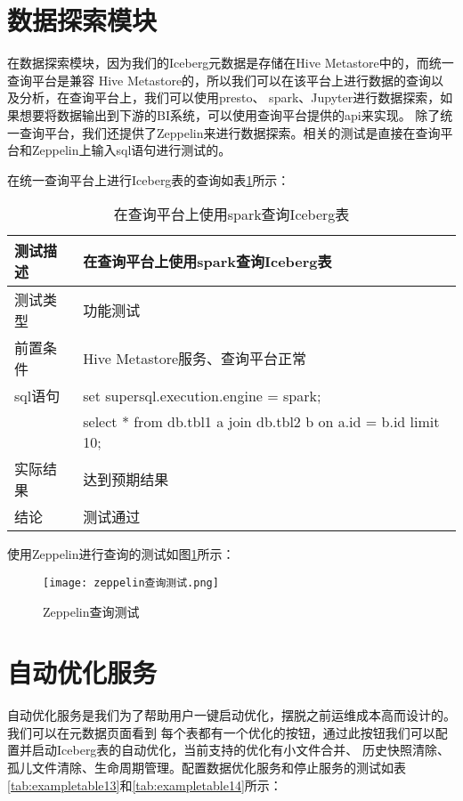 \section{数据探索模块}

在数据探索模块，因为我们的Iceberg元数据是存储在Hive Metastore中的，而统一查询平台是兼容
Hive Metastore的，所以我们可以在该平台上进行数据的查询以及分析，在查询平台上，我们可以使用presto、
spark、Jupyter进行数据探索，如果想要将数据输出到下游的BI系统，可以使用查询平台提供的api来实现。
除了统一查询平台，我们还提供了Zeppelin来进行数据探索。相关的测试是直接在查询平台和Zeppelin上输入sql语句进行测试的。

在统一查询平台上进行Iceberg表的查询如表\ref{tab:exampletable12}所示：

\begin{table}[H]
  \centering
  \caption{在查询平台上使用spark查询Iceberg表}
  \label{tab:exampletable12}
  \begin{tabular}{ll}
    \toprule
    测试描述         & 在查询平台上使用spark查询Iceberg表         \\
    \midrule
    测试类型         & 功能测试         \\
    前置条件         & Hive Metastore服务、查询平台正常         \\
    sql语句         & set supersql.execution.engine = spark;    \\
                   & select * from db.tbl1 a join db.tbl2 b on a.id = b.id limit 10;       \\
    实际结果         & 达到预期结果           \\
    结论            & 测试通过           \\
    \bottomrule
  \end{tabular}
\end{table}

使用Zeppelin进行查询的测试如图\ref{fig:badge1}所示：

\begin{figure}[H]
  \centering
  \texttt{[image: zeppelin查询测试.png]}
  \caption{Zeppelin查询测试}
  \label{fig:badge1}
\end{figure}

\section{自动优化服务}

自动优化服务是我们为了帮助用户一键启动优化，摆脱之前运维成本高而设计的。我们可以在元数据页面看到
每个表都有一个优化的按钮，通过此按钮我们可以配置并启动Iceberg表的自动优化，当前支持的优化有小文件合并、
历史快照清除、孤儿文件清除、生命周期管理。配置数据优化服务和停止服务的测试如表\ref{tab:exampletable13}和\ref{tab:exampletable14}所示：

